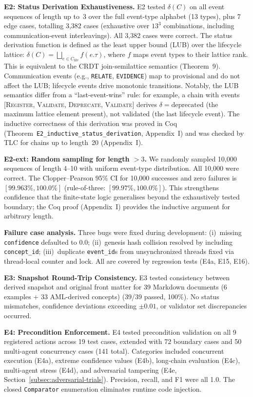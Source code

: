 \textbf{E2: Status Derivation Exhaustiveness.} E2 tested $\delta(C)$ on all event sequences of length up to~3 over the full event-type alphabet (13 types), plus 7 edge cases, totalling 3{,}382 cases (exhaustive over $13^3$ combinations, including communication-event interleavings). All 3{,}382 cases were correct. The status derivation function is defined as the least upper bound (LUB) over the lifecycle lattice: $\delta(C) = \bigsqcup_{e \in C_{\text{life}}} f(e.\tau)$, where $f$ maps event types to their lattice rank. This is equivalent to the CRDT join-semilattice semantics (Theorem~9). Communication events (e.g., \texttt{RELATE}, \texttt{EVIDENCE}) map to $\text{provisional}$ and do not affect the LUB; lifecycle events drive monotonic transitions. Notably, the LUB semantics differ from a ``last-event-wins'' rule: for example, a chain with events [\textsc{Register}, \textsc{Validate}, \textsc{Deprecate}, \textsc{Validate}] derives $\delta = \text{deprecated}$ (the maximum lattice element present), not $\text{validated}$ (the last lifecycle event). The inductive correctness of this derivation was proved in Coq (Theorem~\texttt{E2\_inductive\_status\_derivation}, Appendix~I) and was checked by TLC for chains up to length~20 (Appendix~I).

\textbf{E2-ext: Random sampling for length $>3$.} We randomly sampled 10{,}000 sequences of length 4--10 with uniform event-type distribution. All 10{,}000 were correct. The Clopper--Pearson 95\% CI for 10{,}000 successes and zero failures is $[99.963\%, 100.0\%]$ (rule-of-three: $[99.97\%, 100.0\%]$). This strengthens confidence that the finite-state logic generalises beyond the exhaustively tested boundary; the Coq proof (Appendix~I) provides the inductive argument for arbitrary length.

\textbf{Failure case analysis.} Three bugs were fixed during development: (i)~missing \texttt{confidence} defaulted to $0.0$; (ii)~genesis hash collision resolved by including \texttt{concept\_id}; (iii)~duplicate \texttt{event\_id}s from unsynchronized threads fixed via thread-local counter and lock. All are covered by regression tests (E4a, E15, E16).

\textbf{E3: Snapshot Round-Trip Consistency.} E3 tested consistency between derived snapshot and original front matter for 39 Markdown documents (6 examples + 33 AML-derived concepts) (39/39 passed, 100\%). No status mismatches, confidence deviations exceeding $\pm 0.01$, or validator set discrepancies occurred.

\textbf{E4: Precondition Enforcement.} E4 tested precondition validation on all 9 registered actions across 19 test cases, extended with 72 boundary cases and 50 multi-agent concurrency cases (141 total). Categories included concurrent execution (E4a), extreme confidence values (E4b), long-chain evaluation (E4c), multi-agent stress (E4d), and adversarial tampering (E4e, Section~\ref{subsec:adversarial-trials}). Precision, recall, and F1 were all 1.0. The closed \texttt{Comparator} enumeration eliminates runtime code injection.

